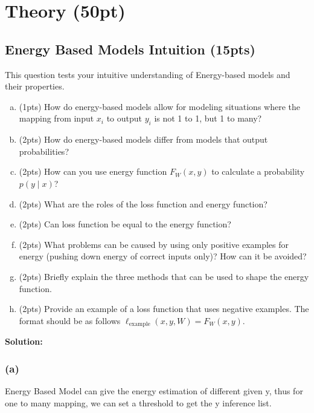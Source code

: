 \section{Theory (50pt)}

\subsection{Energy Based Models Intuition (15pts) }
This question tests your intuitive understanding of Energy-based models and their properties.
\begin{enumerate}[(a)]

    \item (1pts) How do energy-based models allow for modeling situations where the mapping from input $x_i$ to output $y_i$ is not 1 to 1, but 1 to many?



    \item (2pts) How do energy-based models differ from models that output probabilities?

    \item  (2pts) How can you use energy function $F_W(x, y)$ to calculate a probability $p(y \mid x)$?

    \item (2pts) What are the roles of the loss function and energy function?

    \item (2pts) Can loss function be equal to the energy function?

    \item (2pts) What problems can be caused by using only positive examples for energy (pushing down energy of correct inputs only)? How can it be avoided?

    \item
          (2pts) Briefly explain the three methods that can be used to shape the energy function.

    \item (2pts) Provide an example of a loss function that uses negative examples. The format should be as follows $\ell_\text{example}(x, y, W) = F_W(x, y)$.

\end{enumerate}

\textbf{Solution:}

\subsubsection*{(a)}
Energy Based Model can give the energy estimation of different given y, thus for one to many mapping, we can set a threshold to get the y inference list.

